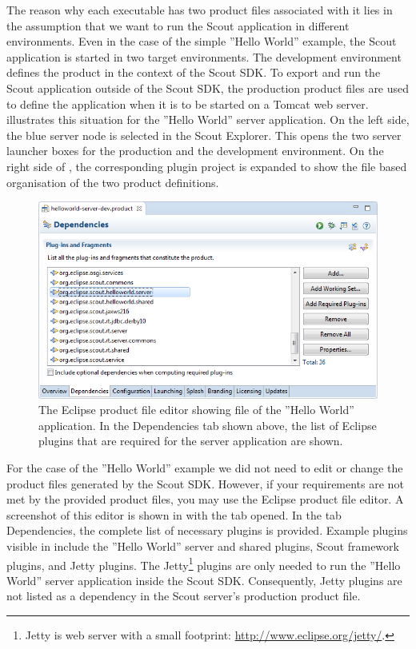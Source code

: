 \documentclass[a4paper,10pt,twoside]{book}
\begin{document}
The reason why each executable has two product files associated with it lies in the assumption that we want to run the Scout application in different environments.
Even in the case of the simple ''Hello World'' example, the Scout application is started in two target environments.
The development environment defines the product in the context of the Scout SDK.
To export and run the Scout application outside of the Scout SDK, the production product files are used to define the application when it is to be started on a Tomcat web server.
 illustrates this situation for the ''Hello World'' server application. 
On the left side, the blue server node is selected in the Scout Explorer.
This opens the two server launcher boxes for the production and the development environment.
On the right side of , the corresponding plugin project  is expanded to show the file based organisation of the two product definitions.

\begin{figure}
\includegraphics[width=14cm]{sdk_server_dev_product.png} 
\caption{The Eclipse product file editor showing file  of the ''Hello World'' application.
In the Dependencies tab shown above, the list of Eclipse plugins that are required for the server application are shown.
}
\end{figure}

For the case of the ''Hello World'' example we did not need to edit or change the product files generated by the Scout SDK. 
However, if your requirements are not met by the provided product files, you may use the Eclipse product file editor.
A screenshot of this editor is shown in  with the tab  opened.
In the tab Dependencies, the complete list of necessary plugins is provided.
Example plugins visible in  include the ''Hello World'' server and shared plugins, Scout framework plugins, and Jetty plugins.
The Jetty\footnote{
Jetty is web server with a small footprint: \url{http://www.eclipse.org/jetty/}.
} 
plugins are only needed to run the ''Hello World'' server application inside the Scout SDK.
Consequently, Jetty plugins are not listed as a dependency in the Scout server's production product file.
\end{document}
